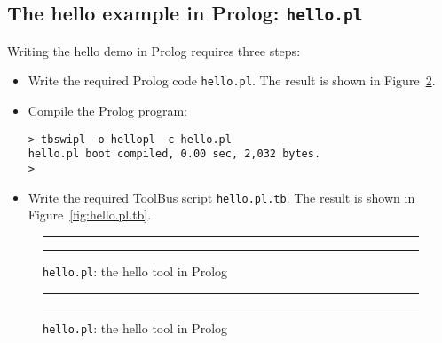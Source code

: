 \subsection{\label{Ex-hello.pl}The hello example in Prolog: {\tt hello.pl}}

Writing the hello demo in Prolog requires three steps:
\begin{itemize}
\item Write the required Prolog code {\tt hello.pl}. 
      The result is shown in Figure~\ref{fig:hello.pl}.
\item Compile the Prolog program:
\begin{verbatim}
> tbswipl -o hellopl -c hello.pl
hello.pl boot compiled, 0.00 sec, 2,032 bytes.
>
\end{verbatim}
\item Write the required ToolBus script {\tt hello.pl.tb}.
      The result is shown in Figure~\ref{fig:hello.pl.tb}.
\end{itemize}

\begin{figure}
\rule{\textwidth}{0.5mm}

  \caption{{\tt hello.pl}: the hello tool in Prolog}
  \label{fig:hello.pl}
\rule{\textwidth}{0.5mm}
\end{figure}

\begin{figure}
\rule{\textwidth}{0.5mm}

  \caption{{\tt hello.pl}: the hello tool in Prolog}
  \label{fig:hello.pl}
\rule{\textwidth}{0.5mm}
\end{figure}
